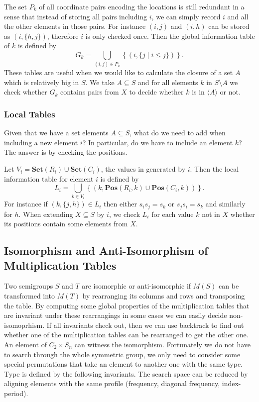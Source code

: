 \documentclass{amsart}
\newcommand{\Set}{\mathbf{Set}}
\newcommand{\Pos}{\mathbf{Pos}}
\theoremstyle{plain}
\theoremstyle{definition}
\begin{document}
The set $P_k$ of all coordinate pairs encoding the locations is still redundant in a sense that instead of storing all pairs including $i$, we can simply record $i$ and all the other elements in those pairs.
For instance $(i,j)$ and $(i,h)$ can be stored as $(i,\{h,j\})$, therefore $i$ is only checked once.
Then the  global information table of $k$ is defined by
$$G_k=\bigcup_{(i,j)\in P_k} \left\{ (i,\{j\mid i\leq j\})\right\}.$$
These tables are useful when we would like to calculate the closure of a set $A$ which is relatively big in $S$.
We take $A\subseteq S$ and for all elements $k$ in $S\setminus A$ we check whether $G_k$ contains pairs from $X$ to decide whether $k$ is in $\langle A\rangle$ or not. 

\subsubsection{Local Tables} Given that we have a set elements $A\subseteq S$, what do we need to add when including a new element $i$?
In particular, do we have to include an element $k$? The answer is by checking the positions. 

Let $V_i=\Set(R_i)\cup\Set(C_i)$, the values in generated by $i$. Then the  local information table for element $i$ is defined by
$$L_i=\bigcup_{k\in V_i}\left\{(k,\Pos(R_i,k)\cup\Pos(C_i,k))\right\}.$$
For instance if $(k,\{j,h\})\in L_i$ then either $s_is_j=s_k$ or $s_js_i=s_k$ and similarly for $h$.
When  extending $X\subseteq S$ by $i$, we check $L_i$ for each value $k$ not in $X$ whether its positions contain some elements from $X$. 
\subsection{Isomorphism and Anti-Isomorphism of Multiplication Tables}
Two semigroups $S$ and $T$ are isomorphic or anti-isomorphic if $M(S)$ can be transformed into $M(T)$ by rearranging its columns and rows and transposing the table.
By computing some global properties of the multiplication tables that are invariant under these rearrangings in some cases we can easily decide non-isomoprhism.
If all invariants check out, then we can use backtrack to find out whether one of the multiplication tables can be rearranged to get the other one.
An element of $C_2\times S_n$ can witness the isomorphism.
Fortunately we do not have to search through the whole symmetric group, we only need to consider some special permutations that take an element to another one with the same type.
Type is defined by the following invariants.
The search space can be reduced by aligning elements with the same profile (frequency, diagonal frequency, index-period).
\end{document}
